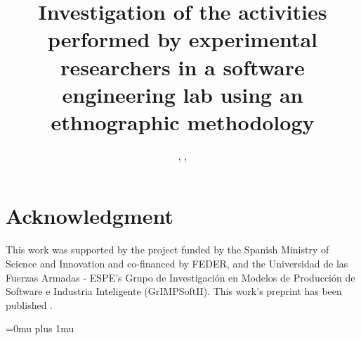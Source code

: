\documentclass{cta-author}%
\begin{document}

\title{Investigation of the activities performed by experimental researchers in a software engineering lab using an ethnographic methodology}

\author{, , }

\address{
}



\maketitle








%

\section*{Acknowledgment}
This work was supported by the project  funded by the Spanish Ministry of Science and Innovation and co-financed by FEDER, and the Universidad de las Fuerzas Armadas  - ESPE's Grupo de Investigación en Modelos de Producción de Software e Industria Inteligente (GrIMPSoftII). This work's preprint has been published \cite{Fonseca-2023-experimentation-proccess-SE-unpublished}.


\Urlmuskip=0mu plus 1mu\relax


\end{document}
